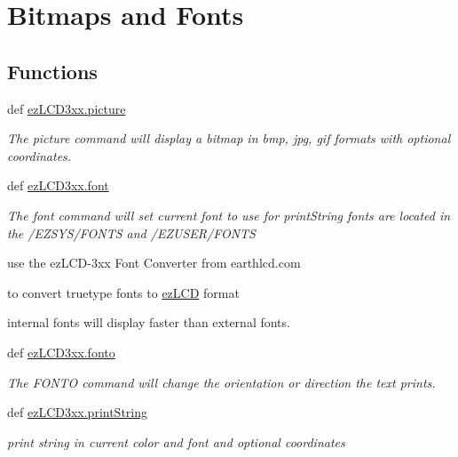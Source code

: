 \hypertarget{group___bitmap_font}{\section{Bitmaps and Fonts}
\label{d2/d7e/group___bitmap_font}
}
\subsection*{Functions}
\begin{DoxyCompactItemize}
\item 
def \hyperlink{group___bitmap_font_ga3bdde0a3f8505adbfb3c4b7107da7650}{ez\-L\-C\-D3xx.\-picture}
\begin{DoxyCompactList}\small\item\em The picture command will display a bitmap in bmp, jpg, gif formats with optional coordinates. \end{DoxyCompactList}\item 
def \hyperlink{group___bitmap_font_ga7099c8ffc9b76ad3213d241bb8b8070f}{ez\-L\-C\-D3xx.\-font}
\begin{DoxyCompactList}\small\item\em The font command will set current font to use for print\-String fonts are located in the /\-E\-Z\-S\-Y\-S/\-F\-O\-N\-T\-S and /\-E\-Z\-U\-S\-E\-R/\-F\-O\-N\-T\-S \par
 use the ez\-L\-C\-D-\/3xx Font Converter from earthlcd.\-com \par
 to convert truetype fonts to \hyperlink{classez_l_c_d3xx_1_1ez_l_c_d}{ez\-L\-C\-D} format \par
 internal fonts will display faster than external fonts. \end{DoxyCompactList}\item 
def \hyperlink{group___bitmap_font_ga445e7a916dbdae456f88bea5fcd88745}{ez\-L\-C\-D3xx.\-fonto}
\begin{DoxyCompactList}\small\item\em The F\-O\-N\-T\-O command will change the orientation or direction the text prints. \end{DoxyCompactList}\item 
def \hyperlink{group___bitmap_font_gac3a90d479a0423de66988b9850f4852c}{ez\-L\-C\-D3xx.\-print\-String}
\begin{DoxyCompactList}\small\item\em print string in current color and font and optional coordinates \end{DoxyCompactList}\end{DoxyCompactItemize}


